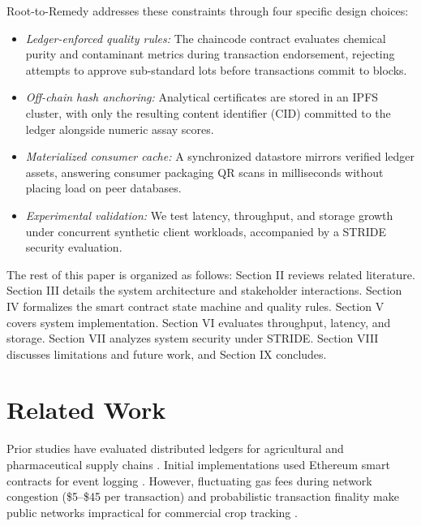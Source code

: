\documentclass[conference]{IEEEtran}
\begin{document}
Root-to-Remedy addresses these constraints through four specific design choices:
\begin{itemize}
    \item \emph{Ledger-enforced quality rules:} The chaincode contract evaluates chemical purity and contaminant metrics during transaction endorsement, rejecting attempts to approve sub-standard lots before transactions commit to blocks.
    \item \emph{Off-chain hash anchoring:} Analytical certificates are stored in an IPFS cluster, with only the resulting content identifier (CID) committed to the ledger alongside numeric assay scores.
    \item \emph{Materialized consumer cache:} A synchronized datastore mirrors verified ledger assets, answering consumer packaging QR scans in milliseconds without placing load on peer databases.
    \item \emph{Experimental validation:} We test latency, throughput, and storage growth under concurrent synthetic client workloads, accompanied by a STRIDE security evaluation.
\end{itemize}

The rest of this paper is organized as follows: Section II reviews related literature. Section III details the system architecture and stakeholder interactions. Section IV formalizes the smart contract state machine and quality rules. Section V covers system implementation. Section VI evaluates throughput, latency, and storage. Section VII analyzes system security under STRIDE. Section VIII discusses limitations and future work, and Section IX concludes.

\section{Related Work}
Prior studies have evaluated distributed ledgers for agricultural and pharmaceutical supply chains \cite{kamilaris2019rise, clauson2018leveraging}. Initial implementations used Ethereum smart contracts for event logging \cite{feng2020blockchain}. However, fluctuating gas fees during network congestion (\$5--\$45 per transaction) and probabilistic transaction finality make public networks impractical for commercial crop tracking \cite{monrat2019performance}.
\end{document}
